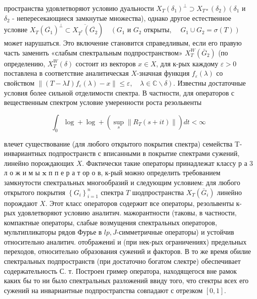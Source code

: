 \documentclass[10pt]{article}
\begin{document}
пространства удовлетворяют условию дуальности $X_{T}\left(\delta_{1}\right)^{\perp} \supset X_{T *}\left(\delta_{2}\right)\left(\delta_{1}\right.$ и $\delta_{2}$ - непересекающиеся замкнутые множества), однако другое естественное условие $\left.X_{T}\left(\overline{G_{1}}\right)^{\perp} \subset \overline{X_{T^{*}}\left(\overline{G_{2}}\right.}\right) \quad\left(G_{1}\right.$ и $G_{2}$ открыты, $\left.\quad G_{1} \cup G_{2}=\sigma(T)\right)$ может нарушаться. Это включение становится справедливым, если его правую часть заменить «слабым спектральным подпространством» $X_{T}^{W}\left(\bar{G}_{2}\right)$ (по определению, $X_{T}^{W}(\delta)$ состоит из векторов $x \in X$, для к-рых каждому $\varepsilon>0$ поставлена в соответствие аналитическая $X$-значная функция $f_{\varepsilon}(\lambda)$ со свойством $\left.\left\|(T-\lambda I) f_{\varepsilon}(\lambda)-x\right\| \leqslant \varepsilon, \quad \lambda \in \mathbb{C} \backslash \delta\right)$. Известны достаточные условия более сильной отделимости спектра. В частности, для операторов с вещественным спектром условие умеренности роста резольвенты



\[

\int_{0} \log +\log +\left(\sup _{s}\left\|R_{T}(s+i t)\right\|\right) d t<\infty

\]



влечет существование (для любого открытого покрытия спектра) семейства T-инвариантных подпространств с вписанными в покрытие спектрами сужений, линейно порождающих $X$. Фактически такие операторы принадлежат классу р а 3 л $о$ ж и м ы $\mathbf{x}$ п п е р а т ор о в, к-рый можно определить требованием замкнутости спектральных многообразий и следующим условием: для любого открытого покрытия $\left\{G_{i}\right\}_{i=1}^{n}$ спектра $T$ шодпространства $X_{T}\left(\bar{G}_{i}\right)$ линейно порождают $X$. Этот класс операторов содержит все операторы, резольвенты к-рых удовлетворяют условию аналитич. мажорантности (таковы, в частности, компактные операторы, слабые возмущения спектральных операторов, мультипликаторы рядов Фурье в $l p, J$-симметричные операторы) и устойчив относительно аналитич. отображениї и (при нек-рых ограничениях) предельных переходов, относительно образования сужений и факторов. В то же время обилие спектральных подпространств (при достаточно богатом слектре) обеспечивает содержательность С. т. Построен гример оператора, находящегося вне рамок каких бы то ни было спектральных разложений ввиду того, что сгектры всех его сужений на инвариантные подпрострапства совпадают с отрезком $[0,1]$.
\end{document}
